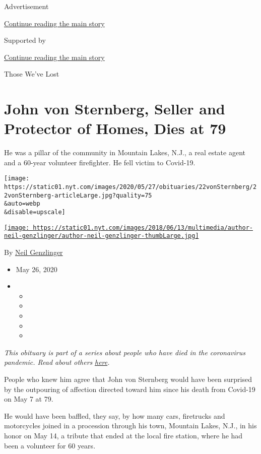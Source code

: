 Advertisement

\protect\hyperlink{after-top}{Continue reading the main story}

Supported by

\protect\hyperlink{after-sponsor}{Continue reading the main story}

Those We've Lost

\hypertarget{john-von-sternberg-seller-and-protector-of-homes-dies-at-79}{%
\section{John von Sternberg, Seller and Protector of Homes, Dies at
79}\label{john-von-sternberg-seller-and-protector-of-homes-dies-at-79}}

He was a pillar of the community in Mountain Lakes, N.J., a real estate
agent and a 60-year volunteer firefighter. He fell victim to Covid-19.

\texttt{[image: https://static01.nyt.com/images/2020/05/27/obituaries/22vonSternberg/22vonSternberg-articleLarge.jpg?quality=75\\\&auto=webp\\\&disable=upscale]}

\href{https://www.nytimes.com/by/neil-genzlinger}{\texttt{[image: https://static01.nyt.com/images/2018/06/13/multimedia/author-neil-genzlinger/author-neil-genzlinger-thumbLarge.jpg]}}

By \href{https://www.nytimes.com/by/neil-genzlinger}{Neil Genzlinger}

\begin{itemize}
\item
  May 26, 2020
\item
  \begin{itemize}
  \item
  \item
  \item
  \item
  \item
  \end{itemize}
\end{itemize}

\emph{This obituary is part of a series about people who have died in
the coronavirus pandemic. Read about others}
\href{https://www.nytimes.com/series/people-who-have-died-of-the-coronavirus}{\emph{here}}\emph{.}

People who knew him agree that John von Sternberg would have been
surprised by the outpouring of affection directed toward him since his
death from Covid-19 on May 7 at 79.

He would have been baffled, they say, by how many cars, firetrucks and
motorcycles joined in a procession through his town, Mountain Lakes,
N.J., in his honor on May 14, a tribute that ended at the local fire
station, where he had been a volunteer for 60 years.

